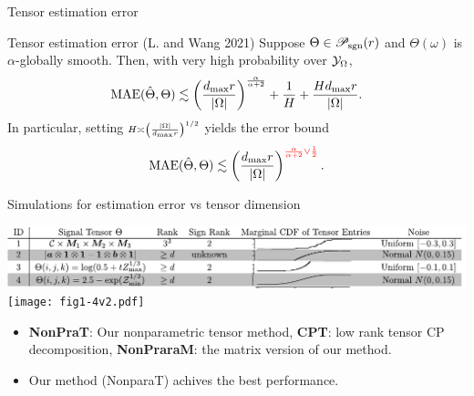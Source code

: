 \documentclass[10pt, mathserif]{beamer} %
\theoremstyle{definition}
\theoremstyle{plain}
\def\caliP{\mathscr{P}_{\textup{sgn}}}
\begin{document}
\begin{frame}{Tensor estimation  error}
    \begin{block}{Tensor estimation error (L. and Wang 2021)}
    Suppose $\Theta\in\caliP(r)$ and  $\Theta(\omega)$ is $\alpha$-globally smooth. Then, with very high probability over $\mathcal{Y}_\Omega$, 
    \begin{equation}\label{eq:bound2}
\textup{MAE}(\hat \Theta, \Theta)\lesssim \left({d_{\max} r \over |\Omega|}\right)^{\alpha\over\alpha+2}+{1\over H}+{Hd_{\max} r \over |\Omega|}.
\end{equation}
In particular, setting $\scriptstyle H\asymp \left( |\Omega|\over d_{\max}r\right)^{1/2}$ yields the error bound
\begin{equation}\label{eq:real}
\textup{MAE}(\hat \Theta, \Theta)\lesssim \left(d_{\max}r \over |\Omega|\right)^{\color{red}{\alpha \over \alpha+2} \vee {1\over 2}}.
\end{equation}
    \end{block}
\end{frame}


\begin{frame}{Simulations for estimation error vs tensor dimension}
    \begin{center}
    \includegraphics[width = \textwidth]{simulation.pdf}
    \texttt{[image: fig1-4v2.pdf]}
    \end{center}
    \begin{itemize}
    \item {\bf NonPraT}: Our nonparametric tensor method, {\bf CPT}: low rank tensor CP decomposition, {\bf NonPraraM}: the matrix version of our method.
    \item Our method (NonparaT) achives the best performance.
    \end{itemize}
\end{frame}
\end{document}
